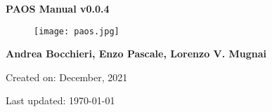

\begin{titlepage}

    \centering

    \vspace*{30mm} %
    \textbf{\Huge {PAOS Manual v0.0.4}}

    \vspace{20mm}
    \begin{figure}[!h]
        \centering
        \texttt{[image: paos.jpg]}
        \label{fig:paos_logo}
    \end{figure}

    \vspace{25mm}
    \Large \textbf{{Andrea Bocchieri, Enzo Pascale, Lorenzo V. Mugnai}}

    \vspace*{8mm}
    \small Created on: December, 2021

    \vspace{2mm}
    \small Last updated: \MonthYearFormat\today


\end{titlepage}

\clearpage
{}
\tableofcontents
\listoffigures
\listoftables
\clearpage
{}